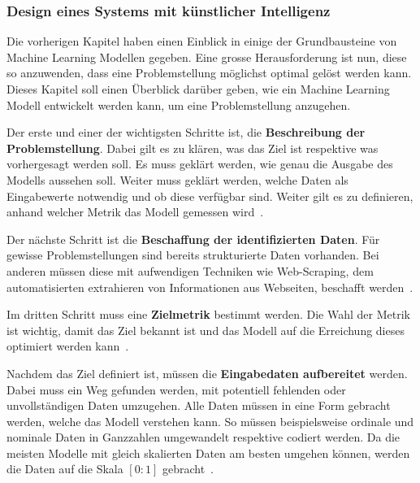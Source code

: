 
\subsubsection{Design eines Systems mit künstlicher Intelligenz}

Die vorherigen Kapitel haben einen Einblick in einige der Grundbausteine von Machine Learning Modellen gegeben. Eine grosse Herausforderung ist nun, diese so anzuwenden, dass eine Problemstellung möglichst optimal gelöst werden kann. Dieses Kapitel soll einen Überblick darüber geben, wie ein Machine Learning Modell entwickelt werden kann, um eine Problemstellung anzugehen.

Der erste und einer der wichtigsten Schritte ist, die \textbf{Beschreibung der Problemstellung}. Dabei gilt es zu klären, was das Ziel ist respektive was vorhergesagt werden soll. Es muss geklärt werden, wie genau die Ausgabe des Modells aussehen soll. Weiter muss geklärt werden, welche Daten als Eingabewerte notwendig und ob diese verfügbar sind. Weiter gilt es zu definieren, anhand welcher Metrik das Modell gemessen wird~\autocite{DesignML}.

Der nächste Schritt ist die \textbf{Beschaffung der identifizierten Daten}. Für gewisse Problemstellungen sind bereits strukturierte Daten vorhanden. Bei anderen müssen diese mit aufwendigen Techniken wie Web-Scraping, dem automatisierten extrahieren von Informationen aus Webseiten, beschafft werden~\autocite{DesignML}.

Im dritten Schritt muss eine \textbf{Zielmetrik} bestimmt werden. Die Wahl der Metrik ist wichtig, damit das Ziel bekannt ist und das Modell auf die Erreichung dieses optimiert werden kann~\autocite{DesignML}.

Nachdem das Ziel definiert ist, müssen die \textbf{Eingabedaten aufbereitet} werden. Dabei muss ein Weg gefunden werden, mit potentiell fehlenden oder unvollständigen Daten umzugehen. Alle Daten müssen in eine Form gebracht werden, welche das Modell verstehen kann. So müssen beispielsweise ordinale und nominale Daten in Ganzzahlen umgewandelt respektive codiert werden. Da die meisten Modelle mit gleich skalierten Daten am besten umgehen können, werden die Daten auf die Skala $[0:1]$ gebracht~\autocite{DesignML}.

